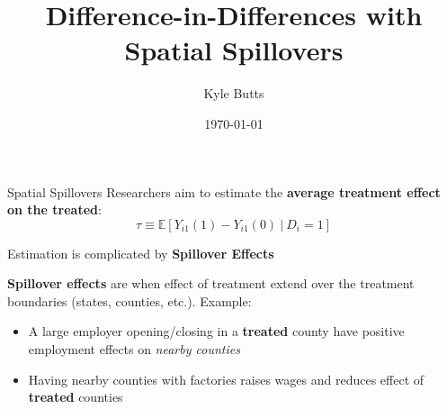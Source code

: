 \documentclass[aspectratio=169]{beamer}
\title{Difference-in-Differences with Spatial Spillovers}
\date{\today}
\author{Kyle Butts}
\begin{document}
\maketitle

\begin{frame}{Spatial Spillovers}
    Researchers aim to estimate the \textbf{average treatment effect on the treated}: 
    \[
        \tau \equiv \mathbb{E} \left[ Y_{i1}(1) - Y_{i1}(0) \ \vert \ D_{i} = 1 \right]
    \]
    
    Estimation is complicated by \textbf{Spillover Effects}
    
    \vspace{5mm}
    \textbf{Spillover effects} are when effect of treatment extend over the treatment boundaries (states, counties, etc.). Example:
    
    \begin{itemize}
        \item A large employer opening/closing in a \textbf{treated} county have positive employment effects on \textit{nearby counties}
        
        \item Having nearby counties with factories raises wages and reduces effect of \textbf{treated} counties
    \end{itemize}
\end{frame}
\end{document}
